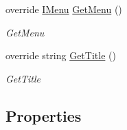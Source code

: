 \begin{DoxyCompactItemize}
override \mbox{\hyperlink{interface_gtd_app_1_1_console_core_1_1_menu_1_1_i_menu}{I\+Menu}} \mbox{\hyperlink{class_gtd_app_1_1_console_1_1_views_1_1_dashboard_view_a2e6ef17223902830997ae979443dbfc0}{Get\+Menu}} ()
\begin{DoxyCompactList}\small\item\em Get\+Menu \end{DoxyCompactList}\item 
override string \mbox{\hyperlink{class_gtd_app_1_1_console_1_1_views_1_1_dashboard_view_a4a79eed87af25262f6b75e8d7641806c}{Get\+Title}} ()
\begin{DoxyCompactList}\small\item\em Get\+Title \end{DoxyCompactList}\end{DoxyCompactItemize}
\subsection*{Properties}
